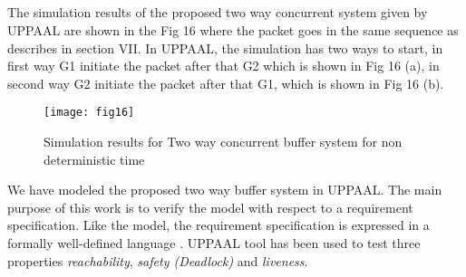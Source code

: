 \documentclass[letterpaper]{article}
\begin{document}
\subsection{} The simulation results of the proposed two way concurrent system given by UPPAAL are shown in the Fig 16 where the packet goes in the same sequence as describes in section VII. In UPPAAL, the simulation has two ways to start, in first way G1 initiate the packet after that G2 which is shown in Fig 16 (a), in second way G2 initiate the packet after that G1, which is shown in Fig 16 (b).
\begin{figure}[bpht!]
\centering
	\texttt{[image: fig16]}
		\caption{Simulation results for Two way concurrent buffer system for non deterministic time}
	\label{Fig16}
\end{figure}



We have modeled the proposed two way buffer system in UPPAAL. The main purpose of this work is to verify the model with respect to a requirement specification. Like the model, the requirement specification is expressed in a formally well-defined language \cite{MHMR04}. UPPAAL tool has been used to test three properties \textit{reachability}, \textit{safety (Deadlock)} and \textit{liveness}. 
\end{document}
